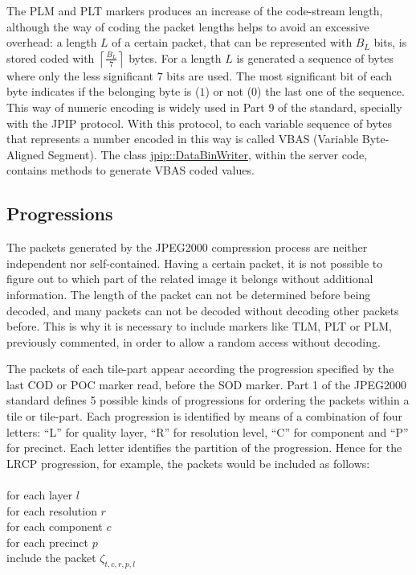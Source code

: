The PLM and PLT markers produces an increase of the code-stream
length, although the way of coding the packet lengths helps to
avoid an excessive overhead: a length $L$ of a certain packet,
that can be represented with $B_{L}$ bits, is stored coded
with $\left \lceil \frac{B_{L}}{7} \right \rceil$ bytes. For a
length $L$ is generated a sequence of bytes where only the
less significant $7$ bits are used. The most significant
bit of each byte indicates if the belonging byte is ($1$) or
not ($0$) the last one of the sequence. This way of numeric
encoding is widely used in Part 9 of the standard, specially with
the JPIP protocol. With this protocol, to each variable sequence
of bytes that represents a number encoded in this way is called
VBAS (Variable Byte-Aligned Segment). The class
\hyperlink{classjpip_1_1DataBinWriter}{jpip::DataBinWriter}, within the server code,
contains methods to generate VBAS coded values.

\subsection{Progressions}
\label{sec:progresiones}

The packets generated by the JPEG2000 compression process
are neither independent nor self-contained. Having a certain packet,
it is not possible to figure out to which part of the related image
it belongs without additional information. The length of the packet
can not be determined before being decoded, and many packets can not
be decoded without decoding other packets before. This is why it is
necessary to include markers like TLM, PLT or PLM, previously
commented, in order to allow a random access without decoding.

The packets of each tile-part appear according the progression
specified by the last COD or POC marker read, before the
SOD marker. Part 1 of the JPEG2000 standard defines 5 possible kinds of
progressions for ordering the packets within a tile or tile-part.
Each progression is identified by means of a combination
of four letters: ``L'' for quality layer, ``R'' for resolution
level, ``C'' for component and ``P'' for precinct. Each letter identifies
the partition of the progression. Hence for the LRCP progression,
for example, the packets would be included as follows:\\
\\for each layer $l$\\
\hspace*{1cm} for each resolution $r$\\
\hspace*{2cm} for each component $c$\\
\hspace*{3cm} for each precinct $p$\\
\hspace*{4cm} include the packet $\zeta_{t,c,r,p,l}$\\

